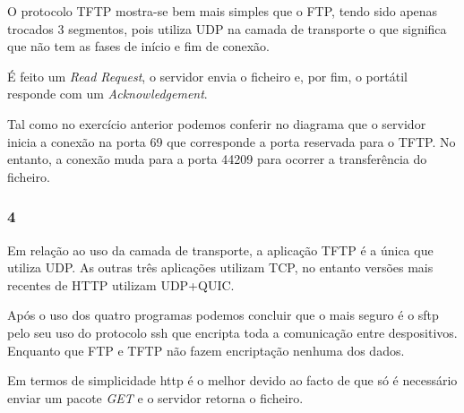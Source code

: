 \documentclass{article}
\begin{document}
                    O protocolo TFTP mostra-se bem mais simples que o FTP, tendo sido apenas trocados 3 segmentos, pois utiliza UDP na camada de transporte o que significa que não tem as fases de início e fim de conexão.

                    É feito um \textit{Read Request}, o servidor envia o ficheiro e, por fim, o portátil responde com um \textit{Acknowledgement}.

                    Tal como no exercício anterior podemos conferir no diagrama que o servidor inicia a conexão na porta 69 que corresponde a porta reservada para o TFTP. No entanto, a conexão muda para a porta 44209 para ocorrer a transferência do ficheiro.
            \clearpage
            \subsubsection*{4}
		            Em relação ao uso da camada de transporte, a aplicação TFTP é a única que utiliza UDP. As outras três aplicações utilizam TCP, no entanto versões mais recentes de HTTP utilizam UDP+QUIC.

                    Após o uso dos quatro programas podemos concluir que o mais seguro é o sftp pelo seu uso do protocolo ssh que encripta toda a comunicação entre despositivos. Enquanto que FTP e TFTP não fazem encriptação nenhuma dos dados.

                    Em termos de simplicidade http é o melhor devido ao facto de que só é necessário enviar um pacote \textit{GET} e o servidor retorna o ficheiro.
\end{document}
